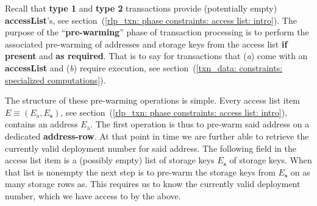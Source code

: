 Recall that \textbf{type 1} and \textbf{type 2} transactions provide (potentially empty) \textbf{accessList}'s,
see section~(\ref{rlp_txn: phase constraints: access list: intro}).
The purpose of the ``\textbf{pre-warming}'' phase of transaction processing is to perform the associated pre-warming of addresses and storage keys from the access list \textbf{if present} and \textbf{as required}.
That is to say for transactions that
(\emph{a}) come with an \textbf{accessList} and
(\emph{b}) require \evm{} execution,
see section~(\ref{txn_data: constraints: specialized computations}).

The structure of these pre-warming operations is simple.
Every access list item $E \equiv (E_\text{a}, E_\textbf{s})$,
see section~(\ref{rlp_txn: phase constraints: access list: intro}), contains an address $E_\text{a}$.
The first operation is thus to pre-warm said address on a dedicated \textbf{address-row}.
At that point in time we are further able to retrieve the currently valid deployment number for said address.
The following field in the access list item is a (possibly empty) list of storage keys $E_\textbf{s}$ of storage keys.
When that list is nonempty the next step is to pre-warm the storage keys from $E_\textbf{s}$ on as many storage rows as.
This requires us to know the currently valid deployment number, which we have access to by the above.

